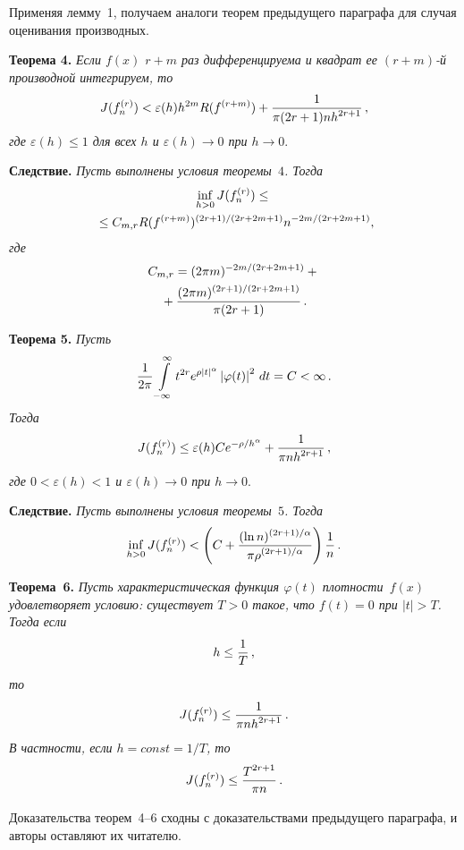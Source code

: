 \begin{multicols}{2}
\smallskip

Применяя лемму~1, получаем аналоги теорем предыдущего параграфа для
случая оценивания производных.

\medskip

\noindent
\textbf{Теорема 4.} \textit{Если $f(x)$ $r+m$ раз дифференцируема и квадрат ее
$(r+m)$-й производной интегрируем, то}
$$
J(f_n^{(r)})< \varepsilon(h)h^{2m}R(f^{(r+m)})+\displaystyle\frac{\displaystyle 1\mathstrut}{\displaystyle \pi(2r+1)nh^{2r+1}\mathstrut}\,,
$$
\textit{где $\varepsilon(h)\le1$ для всех $h$ и $\varepsilon(h)\to0$ при $h\to0$}.


\medskip

\noindent
\textbf{Следствие.} \textit{Пусть выполнены условия теоремы~$4$. Тогда}
\begin{multline*}
\inf\limits_{h>0}J(f_n^{(r)})
\le {}\\
{}\le C_{m,r}R(f^{(r+m)})^{(2r+1)/(2r+2m+1)}n^{-2m/(2r+2m+1)},\hspace*{-1.15225pt}
\end{multline*}
\textit{где}
\begin{multline*}
C_{m,r}=(2\pi m)^{-2m/(2r+2m+1)}+{}\\
{}+
\displaystyle\frac{\displaystyle (2\pi m)^{(2r+1)/(2r+2m+1)}\mathstrut}{\displaystyle \pi(2r+1)\mathstrut}\,.
\end{multline*}


\medskip

\noindent
\textbf{Теорема 5.} \textit{Пусть}
$$
\displaystyle\frac{\displaystyle 1\mathstrut}{\displaystyle 2\pi\mathstrut}\int\limits_{-\infty}^\infty
t^{2r}e^{\rho|t|^\alpha}\left\vert\varphi(t)\right\vert^2\,dt=C<\infty\,.
$$
\textit{Тогда}
$$
J(f_n^{(r)})\le\varepsilon(h)
Ce^{-\rho/h^\alpha}+\displaystyle\frac{\displaystyle 1\mathstrut}{\displaystyle \pi nh^{2r+1}\mathstrut}\,,
$$
\textit{где $0<\varepsilon(h)<1$ и $\varepsilon(h)\to0$ при $h\to0$}.


\medskip

\noindent
\textbf{Следствие.} \textit{Пусть выполнены условия теоремы~$5$. Тогда}
$$
\inf\limits_{h>0}J(f_n^{(r)})< \left(
C+\displaystyle\frac{\displaystyle (\ln n)^{(2r+1)/\alpha}\mathstrut}{\displaystyle \pi\rho^{(2r+1)/\alpha}\mathstrut}\right)
\displaystyle\frac{\displaystyle 1\mathstrut}{\displaystyle n\mathstrut}\,.
$$

\medskip

\noindent
\textbf{Теорема~6.} \textit{Пусть характеристическая функция $\varphi(t)$
плотности~$f(x)$ удовлетворяет условию: существует $T>0$ такое, что
$f(t)=0$ при $|t|>T$. Тогда если}
$$h\le \displaystyle\frac{\displaystyle 1\mathstrut}{\displaystyle T\mathstrut}\,,$$
\textit{то}
$$
J(f_n^{(r)})\le\displaystyle\frac{\displaystyle 1\mathstrut}{\displaystyle \pi nh^{2r+1}\mathstrut}\,.
$$
\textit{В частности, если $h=const=1/T$, то}
$$
J(f_n^{(r)})\le\displaystyle\frac{\displaystyle T^{2r+1}\mathstrut}{\displaystyle \pi n\mathstrut}\,.
$$

\smallskip

Доказательства теорем~4--6 сходны с доказательствами предыдущего
параграфа, и авторы оставляют их читателю.



\end{multicols}
